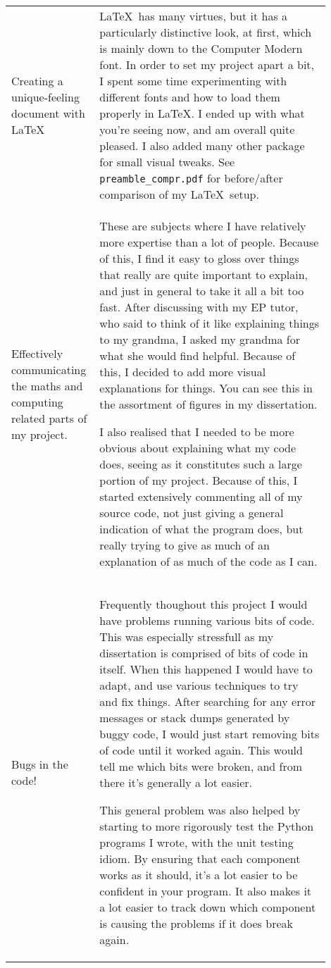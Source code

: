 \documentclass{article}
\begin{document}
\begin{center}
{\begin{longtable}{p{0.2\linewidth} p{0.7\linewidth}}
    Creating a unique-feeling document with \LaTeX &

    \LaTeX\ has many virtues, but it has a particularly distinctive look, at
    first, which is mainly down to the Computer Modern font. In order to set my
    project apart a bit, I spent some time experimenting with different fonts
    and how to load them properly in \LaTeX. I ended up with what you're seeing
    now, and am overall quite pleased. I also added many other package for small
    visual tweaks. See \texttt{preamble\_compr.pdf} for before/after comparison
    of my \LaTeX\ setup. \\

    Effectively communicating the maths and computing related parts of my
    project. &

    These are subjects where I have relatively more expertise than a lot of
    people. Because of this, I find it easy to gloss over things that really are
    quite important to explain, and just in general to take it all a bit too
    fast. After discussing with my EP tutor, who said to think of it like
    explaining things to my grandma, I asked my grandma for what she would find
    helpful. Because of this, I decided to add more visual explanations for
    things. You can see this in the assortment of figures in my dissertation.

    I also realised that I needed to be more obvious about explaining what my
    code does, seeing as it constitutes such a large portion of my project.
    Because of this, I started extensively commenting all of my source code, not
    just giving a general indication of what the program does, but really trying
    to give as much of an explanation of as much of the code as I can.

    \\

    Bugs in the code! &

    Frequently thoughout this project I would have problems running various bits
    of code. This was especially stressfull as my dissertation is comprised of
    bits of code in itself. When this happened I would have to adapt, and use
    various techniques to try and fix things. After searching for any error
    messages or stack dumps generated by buggy code, I would just start removing
    bits of code until it worked again. This would tell me which bits were
    broken, and from there it's generally a lot easier.

    This general problem was also helped by starting to more rigorously test the
    Python programs I wrote, with the unit testing idiom. By ensuring that each
    component works as it should, it's a lot easier to be confident in your
    program. It also makes it a lot easier to track down which component is
    causing the problems if it does break again.

    \\

    \bottomrule
    \end{longtable}
    }

    \end{center}
\end{document}
